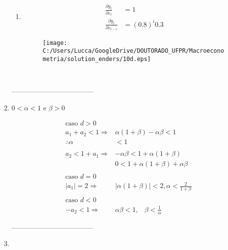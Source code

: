 \begin{enumerate}
\begin{enumerate}
		\item %
		\begin{align*}
			\frac{\partial y_t}{\partial \varepsilon_t}&=1\\
			\frac{\partial y_t}{\partial \varepsilon_{t-i}}&=(0.8)^i0.3
		\end{align*}
		\begin{figure}[h]
			\centering
			\texttt{[image: C:/Users/Lucca/GoogleDrive/DOUTORADO\_UFPR/Macroeconometria/solution\_enders/10d.eps]}
		\end{figure}
		\
	\end{enumerate}
	
	------------------------------------
	
	\pagebreak
	
	
	\item %
	$0<\alpha<1$  e $\beta>0$
	
	\begin{align*}
		\text{caso }d>0 \\
	a_1+a_2<1 \Rightarrow&	\alpha(1+\beta)-\alpha \beta<1\\
		\therefore \alpha&<1\\
		\\		
		a_2<1+a_1 \Rightarrow& -\alpha \beta<1+\alpha(1+\beta)\\
		& 0<1+\alpha(1+\beta)+\alpha \beta\\
		\\
		\text{caso }d=0\\
		|a_1|=2\Rightarrow& |\alpha (1+\beta)|<2, \alpha<\frac{2}{1+\beta}\\
		\\
		\text{caso } d<0\\
		-a_2<1 \Rightarrow& \alpha \beta <1, \;\;\; \beta<\frac{1}{\alpha}
	\end{align*}
		
	------------------------------------
		
		\item %
		

\end{enumerate}
